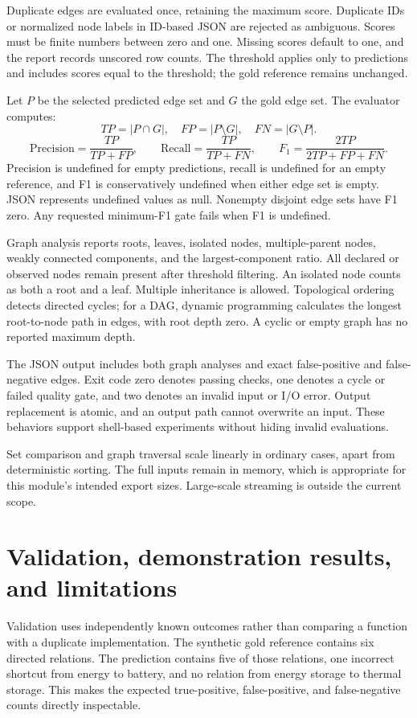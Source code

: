 \documentclass[12pt,a4paper]{article}
\begin{document}
Duplicate edges are evaluated once, retaining the maximum score. Duplicate IDs or normalized node labels in ID-based JSON are rejected as ambiguous. Scores must be finite numbers between zero and one. Missing scores default to one, and the report records unscored row counts. The threshold applies only to predictions and includes scores equal to the threshold; the gold reference remains unchanged.

Let $P$ be the selected predicted edge set and $G$ the gold edge set. The evaluator computes:
\[
TP=|P\cap G|,\quad FP=|P\setminus G|,\quad FN=|G\setminus P|.
\]
\[
\mathrm{Precision}=\frac{TP}{TP+FP},\qquad
\mathrm{Recall}=\frac{TP}{TP+FN},\qquad
F_1=\frac{2TP}{2TP+FP+FN}.
\]
Precision is undefined for empty predictions, recall is undefined for an empty reference, and F1 is conservatively undefined when either edge set is empty. JSON represents undefined values as null. Nonempty disjoint edge sets have F1 zero. Any requested minimum-F1 gate fails when F1 is undefined.

Graph analysis reports roots, leaves, isolated nodes, multiple-parent nodes, weakly connected components, and the largest-component ratio. All declared or observed nodes remain present after threshold filtering. An isolated node counts as both a root and a leaf. Multiple inheritance is allowed. Topological ordering detects directed cycles; for a DAG, dynamic programming calculates the longest root-to-node path in edges, with root depth zero. A cyclic or empty graph has no reported maximum depth.

The JSON output includes both graph analyses and exact false-positive and false-negative edges. Exit code zero denotes passing checks, one denotes a cycle or failed quality gate, and two denotes an invalid input or I/O error. Output replacement is atomic, and an output path cannot overwrite an input. These behaviors support shell-based experiments without hiding invalid evaluations.

Set comparison and graph traversal scale linearly in ordinary cases, apart from deterministic sorting. The full inputs remain in memory, which is appropriate for this module's intended export sizes. Large-scale streaming is outside the current scope.

\clearpage
\section{Validation, demonstration results, and limitations}
Validation uses independently known outcomes rather than comparing a function with a duplicate implementation. The synthetic gold reference contains six directed relations. The prediction contains five of those relations, one incorrect shortcut from energy to battery, and no relation from energy storage to thermal storage. This makes the expected true-positive, false-positive, and false-negative counts directly inspectable.
\end{document}
